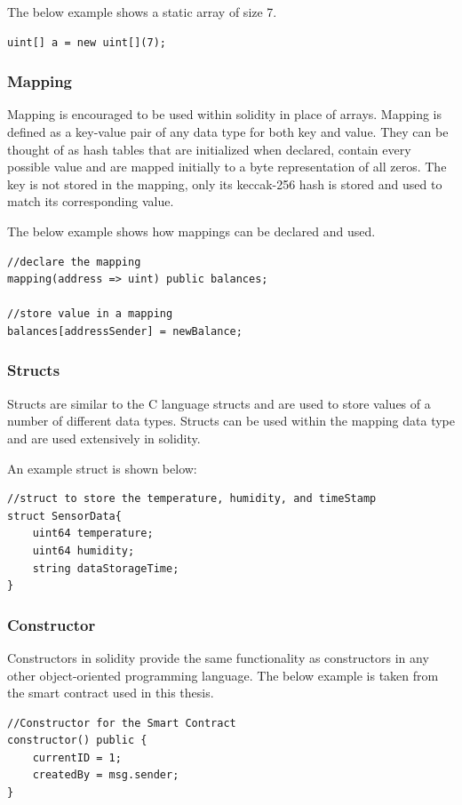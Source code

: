 \documentclass[11pt,openright]{report}
\begin{document}
The below example shows a static array of size 7.
\begin{lstlisting}
uint[] a = new uint[](7);
\end{lstlisting}

\subsubsection{Mapping}
Mapping is encouraged to be used within solidity in place of arrays. Mapping is defined as a key-value pair of any data type for both key and value. They can be thought of as hash tables that are initialized when declared, contain every possible value and are mapped initially to a byte representation of all zeros. The key is not stored in the mapping, only its keccak-256 hash is stored and used to match its corresponding value.

The below example shows how mappings can be declared and used.
\begin{lstlisting}
//declare the mapping
mapping(address => uint) public balances;

//store value in a mapping
balances[addressSender] = newBalance;
\end{lstlisting}

\subsubsection{Structs}
Structs are similar to the C language structs and are used to store values of a number of different data types. Structs can be used within the mapping data type and are used extensively in solidity.

An example struct is shown below:
\begin{lstlisting}
//struct to store the temperature, humidity, and timeStamp
struct SensorData{
    uint64 temperature;
    uint64 humidity;
    string dataStorageTime;
}
\end{lstlisting}

\subsubsection{Constructor}
Constructors in solidity provide the same functionality as constructors in any other object-oriented programming language. The below example is taken from the smart contract used in this thesis.
\begin{lstlisting}
//Constructor for the Smart Contract
constructor() public {
    currentID = 1;
    createdBy = msg.sender;
}
\end{lstlisting}
\end{document}
